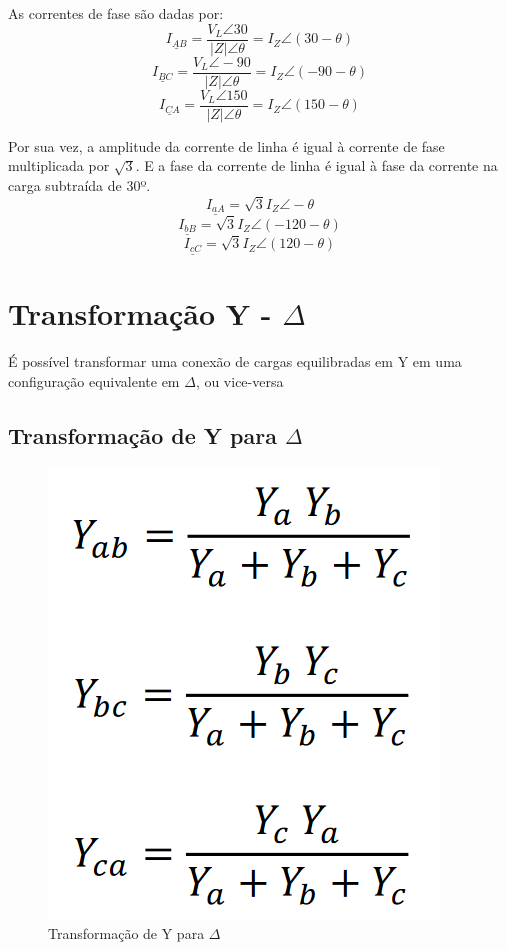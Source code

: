 \documentclass[a4paper, 12pt]{article}
\begin{document}
	As correntes de fase são dadas por:
	\begin{equation}
		\underline{I_{AB}} =  \frac{V_L \angle 30}{|Z| \angle \theta} = I_Z \angle(30 - \theta)
	\end{equation}
	\begin{equation}
		\underline{I_{BC}} =  \frac{V_L \angle -90}{|Z| \angle \theta} = I_Z \angle(-90 - \theta)
	\end{equation}
	\begin{equation}
		\underline{I_{CA}} =  \frac{V_L \angle 150}{|Z| \angle \theta} = I_Z \angle(150 - \theta)
	\end{equation}

	Por sua vez, a amplitude da corrente de linha é igual à corrente de fase multiplicada por $\sqrt{3}$. E a fase da corrente de linha é igual à fase da corrente na carga subtraída de 30º.
	\begin{equation}
		\underline{I_{aA}} = \sqrt{3}I_Z \angle -\theta
	\end{equation}
	\begin{equation}
		\underline{I_{bB}} = \sqrt{3}I_Z \angle (-120-\theta)
	\end{equation}
	\begin{equation}
		\underline{I_{cC}} = \sqrt{3}I_Z \angle (120-\theta)
	\end{equation}

\section{Transformação Y - $\Delta$}
	É possível transformar uma conexão de cargas equilibradas em Y em uma configuração equivalente em $\Delta$, ou vice-versa

	\subsection{Transformação de Y para $\Delta$}
		\begin{figure}[h]
			\centering
			\includegraphics[scale=0.4]{a5.png}
			\caption{Transformação de Y para $\Delta$}
		\end{figure}
\end{document}

